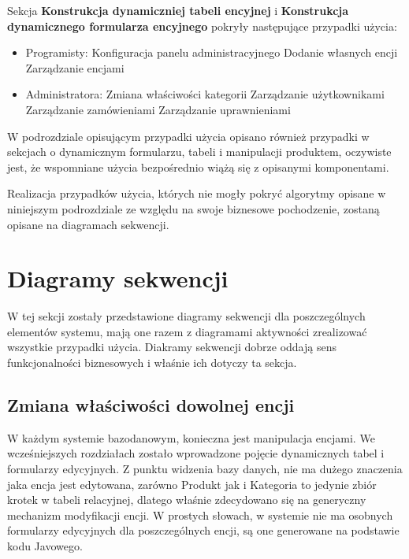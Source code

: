 Sekcja \textbf{Konstrukcja dynamiczniej tabeli encyjnej} i \textbf{Konstrukcja dynamicznego formularza encyjnego} pokryły następujące przypadki użycia:
\begin{itemize}
	\item Programisty: 
	\subitem Konfiguracja panelu administracyjnego
	\subitem Dodanie własnych encji
	\subitem Zarządzanie encjami
	\item Administratora:
	\subitem Zmiana właściwości kategorii
	\subitem Zarządzanie użytkownikami 
	\subitem Zarządzanie zamówieniami
	\subitem Zarządzanie uprawnieniami
\end{itemize}

W podrozdziale opisującym przypadki użycia opisano również przypadki w sekcjach o dynamicznym formularzu, tabeli i manipulacji produktem, oczywiste jest, że wspomniane użycia bezpośrednio wiążą się z opisanymi komponentami.

Realizacja przypadków użycia, których nie mogły pokryć algorytmy opisane w niniejszym podrozdziale ze względu na swoje biznesowe pochodzenie, zostaną opisane na diagramach sekwencji. 
\newpage
\section{Diagramy sekwencji}

W tej sekcji zostały przedstawione diagramy sekwencji dla poszczególnych elementów systemu, mają one razem z diagramami aktywności zrealizować wszystkie przypadki użycia. Diakramy sekwencji dobrze oddają sens funkcjonalności biznesowych i właśnie ich dotyczy ta sekcja. 

\subsection{Zmiana właściwości dowolnej encji}
W każdym systemie bazodanowym, konieczna jest manipulacja encjami. We wcześniejszych rozdziałach zostało wprowadzone pojęcie dynamicznych tabel i formularzy edycyjnych. Z punktu widzenia bazy danych, nie ma dużego znaczenia jaka encja jest edytowana, zarówno Produkt jak i Kategoria to jedynie zbiór krotek w tabeli relacyjnej, dlatego właśnie zdecydowano się na generyczny mechanizm modyfikacji encji. W prostych słowach, w systemie nie ma osobnych formularzy edycyjnych dla poszczególnych encji, są one generowane na podstawie kodu Javowego. 

